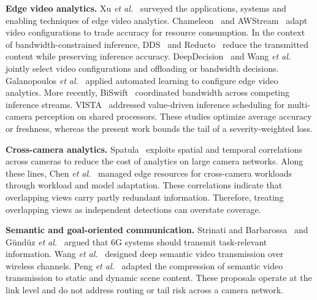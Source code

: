 \documentclass[letterpaper,journal]{IEEEtran}
\begin{document}
\textbf{Edge video analytics.} Xu \emph{et al.}~\cite{chen2023survey} surveyed the applications, systems and enabling techniques of edge video analytics. Chameleon~\cite{jiang2018chameleon} and AWStream~\cite{zhang2018awstream} adapt video configurations to trade accuracy for resource consumption. In the context of bandwidth-constrained inference, DDS~\cite{du2020dds} and Reducto~\cite{li2020reducto} reduce the transmitted content while preserving inference accuracy. DeepDecision~\cite{ran2018deepdecision} and Wang \emph{et al.}~\cite{wang2020joint} jointly select video configurations and offloading or bandwidth decisions. Galanopoulos \emph{et al.}~\cite{galanopoulos2021automl} applied automated learning to configure edge video analytics. More recently, BiSwift~\cite{dai2025biswift} coordinated bandwidth across competing inference streams. VISTA~\cite{chen2026vista} addressed value-driven inference scheduling for multi-camera perception on shared processors. These studies optimize average accuracy or freshness, whereas the present work bounds the tail of a severity-weighted loss.

\textbf{Cross-camera analytics.} Spatula~\cite{jain2020spatula} exploits spatial and temporal correlations across cameras to reduce the cost of analytics on large camera networks. Along these lines, Chen \emph{et al.}~\cite{chen2024crosscam} managed edge resources for cross-camera workloads through workload and model adaptation. These correlations indicate that overlapping views carry partly redundant information. Therefore, treating overlapping views as independent detections can overstate coverage.

\textbf{Semantic and goal-oriented communication.} Strinati and Barbarossa~\cite{strinati2021sixg} and G\"und\"uz \emph{et al.}~\cite{gunduz2023beyond} argued that 6G systems should transmit task-relevant information. Wang \emph{et al.}~\cite{wang2023deepvideo} designed deep semantic video transmission over wireless channels. Peng \emph{et al.}~\cite{peng2026semantic} adapted the compression of semantic video transmission to static and dynamic scene content. These proposals operate at the link level and do not address routing or tail risk across a camera network.
\end{document}
